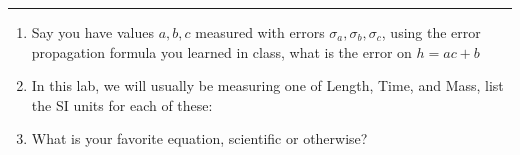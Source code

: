 \documentclass[11pt]{article}
\begin{document}
\Large

\medskip\hrule\bigskip\bigskip
{}
\begin{enumerate}

\item Say you have values $a,b,c$ measured with errors $\sigma_a,\sigma_b,\sigma_c$, using the error propagation formula you learned in class, what is the error on $h=ac+b$
  \vspace*{0.27\textheight}
\item In this lab, we will usually be measuring one of Length, Time, and Mass, list the SI units for each of these:
  \vspace*{0.27\textheight}
\item What is your favorite equation, scientific or otherwise?
  
\end{enumerate}
\end{document}
